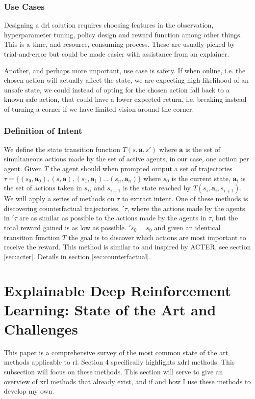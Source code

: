 \documentclass[UKenglish]{uiomasterthesis}
\begin{document}
\subsubsection{Use Cases}
Designing a \ac{drl} solution requires choosing features in the observation, hyperparameter tuning, policy design and reward function among other things. This is a time, and resource, consuming process. These are usually picked by trial-and-error but could be made easier with assistance from an explainer.

Another, and perhaps more important, use case is safety. If when online, i.e. the chosen action will actually affect the state, we are expecting high likelihood of an unsafe state, we could instead of opting for the chosen action fall back to a known safe action, that could have a lower expected return, i.e. breaking instead of turning a corner if we have limited vision around the corner.


\subsubsection{Definition of Intent}
We define the state transition function $T(s, \textbf{a}, s')$ where $\textbf{a}$ is the set of simultaneous actions made by the set of active agents, in our case, one action per agent. Given $T$ the agent should when prompted output a set of trajectories $\tau = \{(s_0,\textbf{a}_0),(s,\textbf{a}),(s_1,\textbf{a}_1)...(s_n,\textbf{a}_n)\}$ where $s_0$ is the current state, $\textbf{a}_i$ is the set of actions taken in $s_i$, and $s_{i+1}$ is the state reached by $T(s_i,\textbf{a}_i, s_{i+1})$. We will apply a series of methods on $\tau$ to extract intent. One of these methods is discovering counterfactual trajectories, $'\tau$, where the actions made by the agents in $'\tau$ are as similar as possible to the actions made by the agents in $\tau$, but the total reward gained is as low as possible. $'s_0 = s_0$ and given an identical transition function $T$ the goal is to discover which actions are most important to receive the reward. This method is similar to and inspired by ACTER\cite{gajcin2024acter}, see section \ref{sec:acter}. Details in section \ref{sec:counterfactual}.

\section{Explainable Deep Reinforcement Learning: State of the Art and Challenges}
This paper is a comprehensive survey of the most common state of the art methods applicable to \ac{rl}. Section 4 specifically highlights \ac{xdrl} methods. This subsection will focus on these methods\cite{sota}. This section will serve to give an overview of \ac{xrl} methods that already exist, and if and how I use these methods to develop my own.
\end{document}
